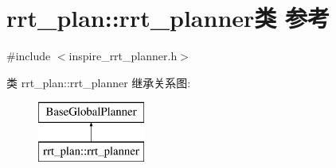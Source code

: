 \hypertarget{classrrt__plan_1_1rrt__planner}{\section{rrt\-\_\-plan\-:\-:rrt\-\_\-planner类 参考}
\label{classrrt__plan_1_1rrt__planner}
}


{\ttfamily \#include $<$inspire\-\_\-rrt\-\_\-planner.\-h$>$}

类 rrt\-\_\-plan\-:\-:rrt\-\_\-planner 继承关系图\-:\begin{figure}[H]
\begin{center}
\leavevmode
\includegraphics[height=2.000000cm]{classrrt__plan_1_1rrt__planner}
\end{center}
\end{figure}
